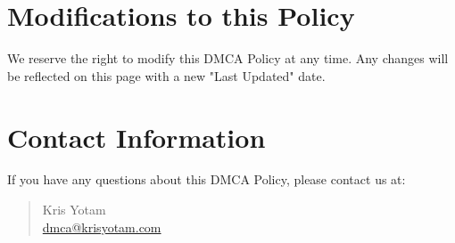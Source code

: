 \documentclass[11pt]{article}
\begin{document}
\section{Modifications to this Policy}
We reserve the right to modify this DMCA Policy at any time. Any changes will be reflected on this page with a new "Last Updated" date.

\section{Contact Information}
If you have any questions about this DMCA Policy, please contact us at:
\begin{quote}
  Kris Yotam\\
  \href{mailto:dmca@krisyotam.com}{dmca@krisyotam.com}
\end{quote}
\end{document}

